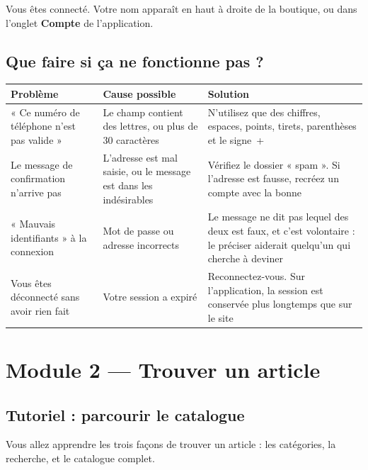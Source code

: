 \documentclass[11pt,a4paper]{report}
\begin{document}
\begin{resultat}
Vous êtes connecté. Votre nom apparaît en haut à droite de la boutique, ou dans
l'onglet \textbf{Compte} de l'application.
\end{resultat}

\subsection{Que faire si ça ne fonctionne pas ?}

\begin{longtable}{@{}p{3.7cm} p{3.7cm} p{6.8cm}@{}}
\toprule
\bfseries Problème & \bfseries Cause possible & \bfseries Solution \\
\midrule
\endhead
« Ce numéro de téléphone n'est pas valide »
  & Le champ contient des lettres, ou plus de 30 caractères
  & N'utilisez que des chiffres, espaces, points, tirets, parenthèses et le
    signe~+ \\[4pt]
Le message de confirmation n'arrive pas
  & L'adresse est mal saisie, ou le message est dans les indésirables
  & Vérifiez le dossier « spam ». Si l'adresse est fausse, recréez un compte
    avec la bonne \\[4pt]
« Mauvais identifiants » à la connexion
  & Mot de passe ou adresse incorrects
  & Le message ne dit pas lequel des deux est faux, et c'est volontaire : le
    préciser aiderait quelqu'un qui cherche à deviner \\[4pt]
Vous êtes déconnecté sans avoir rien fait
  & Votre session a expiré
  & Reconnectez-vous. Sur l'application, la session est conservée plus
    longtemps que sur le site \\
\bottomrule
\end{longtable}

\section{Module 2 — Trouver un article}

\subsection{Tutoriel : parcourir le catalogue}

\begin{objectif}
Vous allez apprendre les trois façons de trouver un article : les catégories,
la recherche, et le catalogue complet.
\end{objectif}
\end{document}
